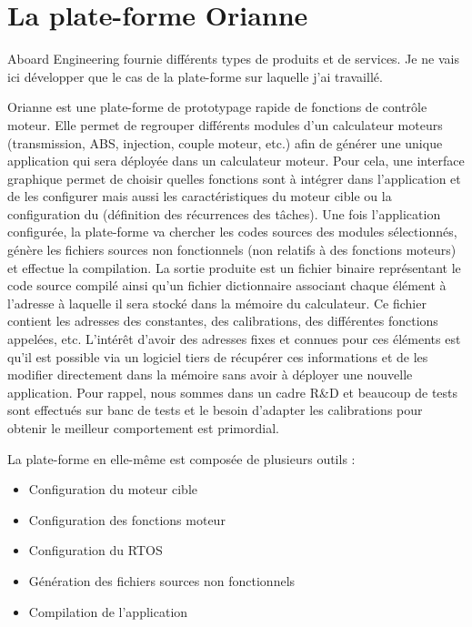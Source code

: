 \section{La plate-forme Orianne}
\label{sec:orianne}

Aboard Engineering fournie différents types de produits et de services. Je ne vais ici développer que le cas de la plate-forme  sur laquelle j'ai travaillé.

Orianne est une plate-forme de prototypage rapide de fonctions de contrôle moteur.
Elle permet de regrouper différents modules d'un calculateur moteurs (transmission, ABS, injection, couple moteur, etc.) afin de générer une unique application qui sera déployée dans un calculateur moteur.
Pour cela, une interface graphique permet de choisir quelles fonctions sont à intégrer dans l'application et de les configurer  mais aussi les caractéristiques du moteur cible ou la configuration du  (définition des récurrences des tâches).
Une fois l'application configurée, la plate-forme va chercher les codes sources des modules sélectionnés, génère les fichiers sources non fonctionnels (non relatifs à des fonctions moteurs) et effectue la compilation.
La sortie produite est un fichier binaire représentant le code source compilé ainsi qu'un fichier \og dictionnaire \fg{} associant chaque élément à l'adresse à laquelle il sera stocké dans la mémoire du calculateur. Ce fichier contient les adresses des constantes, des calibrations, des différentes fonctions appelées, etc.
L'intérêt d'avoir des adresses fixes et connues pour ces éléments est qu'il est possible via un logiciel tiers de récupérer ces informations et de les modifier directement dans la mémoire sans avoir à déployer une nouvelle application. Pour rappel, nous sommes dans un cadre R\&D et beaucoup de tests sont effectués sur banc de tests et le besoin d'adapter les calibrations pour obtenir le meilleur comportement est primordial.

La plate-forme en elle-même est composée de plusieurs outils :
\begin{itemize}
	\item Configuration du moteur cible
	\item Configuration des fonctions moteur
	\item Configuration du RTOS
	\item Génération des fichiers sources non fonctionnels
	\item Compilation de l'application
\end{itemize}

